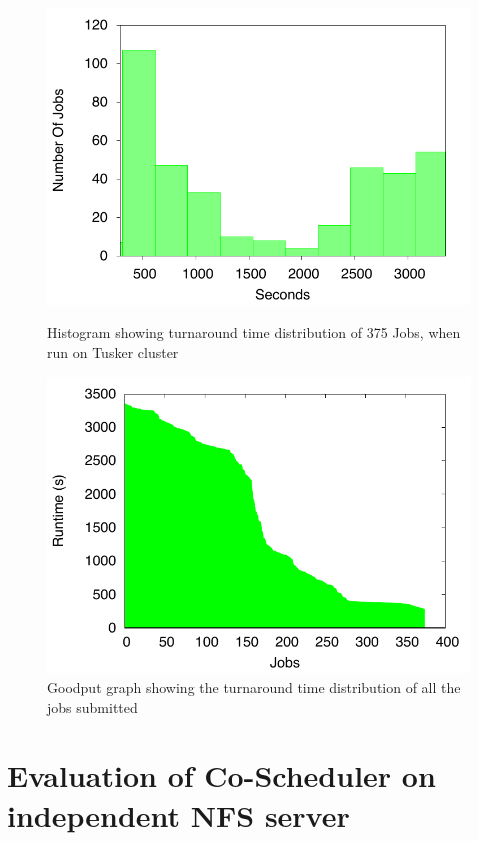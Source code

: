 \documentclass[ms,electronic,double]{nuthesis}
\begin{document}
\begin{figure}[h!]
\begin{center}
\includegraphics{images/tusker_histogram}
\caption{Histogram showing turnaround time distribution of 375 Jobs, when run on Tusker cluster}
\label{fig:tusker_histogram}
\end{center}

\begin{center}
\includegraphics{images/tusker_jobgoodput}
\caption{Goodput graph showing the turnaround time distribution of all the jobs submitted}
\label{fig:tusker_jobgoodput}
\end{center}

\end{figure}
\FloatBarrier

\section{Evaluation of Co-Scheduler on independent NFS server}
\end{document}
